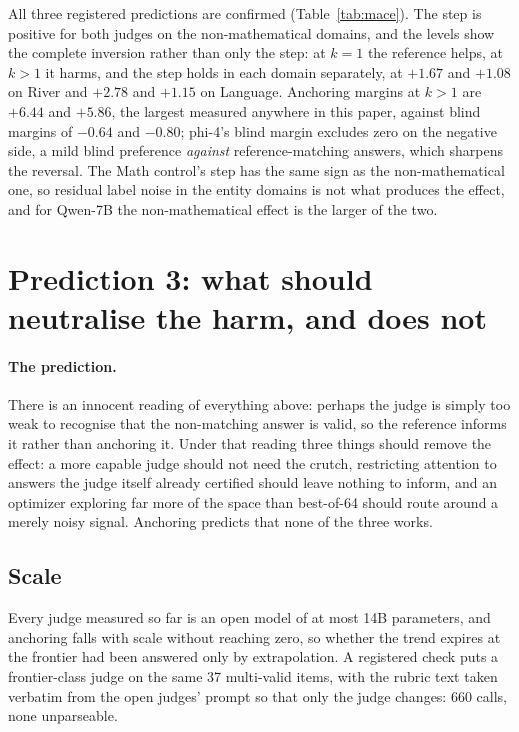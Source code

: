 \documentclass[11pt]{article}
\begin{document}
All three registered predictions are confirmed (Table~\ref{tab:mace}).
The step is positive for both judges on the non-mathematical domains, and the levels show the complete inversion rather than only the step: at $k{=}1$ the reference helps, at $k{>}1$ it harms, and the step holds in each domain separately, at $+1.67$ and $+1.08$ on River and $+2.78$ and $+1.15$ on Language.
Anchoring margins at $k{>}1$ are $+6.44$ and $+5.86$, the largest measured anywhere in this paper, against blind margins of $-0.64$ and $-0.80$; phi-4's blind margin excludes zero on the negative side, a mild blind preference \emph{against} reference-matching answers, which sharpens the reversal.
The Math control's step has the same sign as the non-mathematical one, so residual label noise in the entity domains is not what produces the effect, and for Qwen-7B the non-mathematical effect is the larger of the two.

\section{Prediction 3: what should neutralise the harm, and does not}
\label{sec:p3}

\paragraph{The prediction.}
There is an innocent reading of everything above: perhaps the judge is simply too weak to recognise that the non-matching answer is valid, so the reference informs it rather than anchoring it.
Under that reading three things should remove the effect: a more capable judge should not need the crutch, restricting attention to answers the judge itself already certified should leave nothing to inform, and an optimizer exploring far more of the space than best-of-64 should route around a merely noisy signal.
Anchoring predicts that none of the three works.

\subsection{Scale}
\label{sec:frontier}

Every judge measured so far is an open model of at most 14B parameters, and anchoring falls with scale without reaching zero, so whether the trend expires at the frontier had been answered only by extrapolation.
A registered check puts a frontier-class judge on the same 37 multi-valid items, with the rubric text taken verbatim from the open judges' prompt so that only the judge changes: 660 calls, none unparseable.
\end{document}
